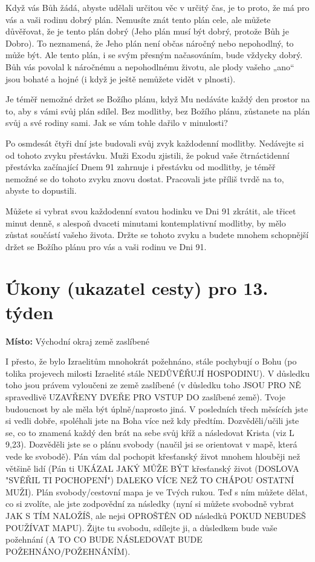 \documentclass[11pt]{article}
\begin{document}
Když vás Bůh žádá, abyste udělali určitou věc v určitý čas, je to proto, že má pro vás a vaši rodinu dobrý plán. Nemusíte znát tento
plán cele, ale můžete důvěřovat, že je tento plán dobrý (Jeho plán musí být dobrý, protože Bůh je Dobro). To neznamená, že Jeho
plán není občas náročný nebo nepohodlný, to může být. Ale tento plán, i se svým přesným načasováním, bude vždycky dobrý. Bůh
vás povolal k náročnému a nepohodlnému životu, ale plody vašeho „ano“ jsou bohaté a hojné (i když je ještě nemůžete vidět
v plnosti).

Je téměř nemožné držet se Božího plánu, když Mu nedáváte každý den prostor na to, aby s vámi svůj plán sdílel. Bez modlitby, bez
Božího plánu, zůstanete na plán svůj a své rodiny sami. Jak se vám tohle dařilo v minulosti?

Po osmdesát čtyři dní jste budovali svůj zvyk každodenní modlitby. Nedávejte si od tohoto zvyku přestávku. Muži Exodu zjistili,
že pokud vaše čtrnáctidenní přestávka začínající Dnem 91 zahrnuje i přestávku od modlitby, je téměř nemožné se do tohoto zvyku
znovu dostat. Pracovali jste příliš tvrdě na to, abyste to dopustili.

Můžete si vybrat svou každodenní svatou hodinku ve Dni 91 zkrátit, ale třicet minut denně, s alespoň dvaceti minutami
kontemplativní modlitby, by mělo zůstat součástí vašeho života. Držte se tohoto zvyku a budete mnohem schopnější držet se
Božího plánu pro vás a vaši rodinu ve Dni 91.
\newpage

\newpage
\section*{Úkony (ukazatel cesty) pro 13. týden}

\textbf{Místo:} Východní okraj země zaslíbené

I přesto, že bylo Izraelitům mnohokrát požehnáno, stále pochybují o Bohu (po tolika projevech milosti Izraelité
stále NEDŮVĚŘUJÍ HOSPODINU). V důsledku toho jsou právem vyloučeni ze země zaslíbené (v důsledku toho
JSOU PRO NĚ spravedlivě UZAVŘENY DVEŘE PRO VSTUP DO zaslíbené země). Tvoje budoucnost by ale měla být
úplně/naprosto jiná. V posledních třech měsících jste si vedli dobře, spoléhali jste na Boha více než kdy
předtím. Dozvěděli/učili jste se, co to znamená každý den brát na sebe svůj kříž a následovat Krista (viz L
9,23). Dozvěděli jste se o plánu svobody (naučil jsi se orientovat v mapě, která vede ke svobodě). Pán vám dal
pochopit křesťanský život mnohem hlouběji než většině lidí (Pán ti UKÁZAL JAKÝ MŮŽE BÝT křesťanský život
(DOSLOVA "SVĚŘIL TI POCHOPENÍ") DALEKO VÍCE NEŽ TO CHÁPOU OSTATNÍ MUŽI). Plán svobody/cestovní mapa je
ve Tvých rukou. Teď s ním můžete dělat, co si zvolíte, ale jste zodpovědní za následky (nyní si můžete
svobodně vybrat JAK S TÍM NALOŽÍŠ, ale nejsi OPROŠTĚN OD následků POKUD NEBUDEŠ POUŽÍVAT MAPU). Žijte tu
svobodu, sdílejte ji, a důsledkem bude vaše požehnání (A TO CO BUDE NÁSLEDOVAT BUDE
POŽEHNÁNO/POŽEHNÁNÍM).
\end{document}
